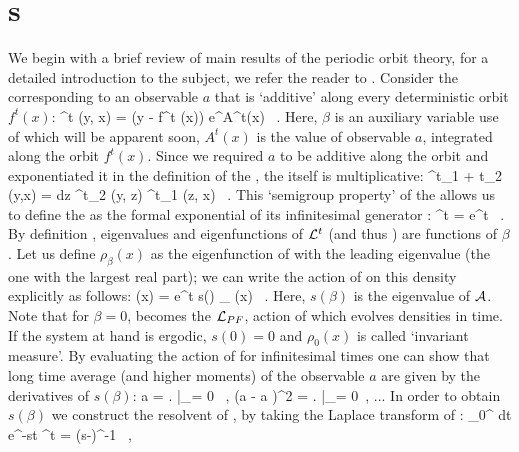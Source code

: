 \section{\CycForm s}
\label{s:DynAvers}

We begin with a brief review of main results of the periodic
orbit theory, for a detailed introduction to the subject, we refer the reader to
. Consider the {\evOper} corresponding to an observable
$a$ that is `additive' along every deterministic orbit $f^t(x)$:
\beq
	\Lop^t (y, x) = \delta (y - f^t (x)) e^{\beta A^t(x)} \, .
	\label{eq-EvOp}
\eeq
Here, $\beta$ is an auxiliary variable use of which will be apparent soon,
$A^t (x)$ is the value of observable $a$, integrated along the orbit $f^t(x)$.
Since we required $a$ to be additive along the orbit and exponentiated
it in the definition of the {\evOper} , the
{\evOper} itself is multiplicative:
\beq
	\Lop^{t_1 + t_2} (y,x) = \int dz \Lop^{t_2} (y, z) \Lop^{t_1} (z, x) \, .
	\label{eq-SemiGroup}
\eeq
This `semigroup property' of the {\evOper} allows us to define
the {\evOper} as the formal exponential of its infinitesimal
generator \Aop :
\beq
	\Lop^t = e^{\Aop t} \, .
	\label{eq-EvOpExp}
\eeq
By definition , eigenvalues and eigenfunctions of ${\cal L}^t$ (and
thus \Aop ) are functions of $\beta$. Let us define $\rho_{\beta} (x)$ as the
eigenfunction of  with the leading eigenvalue (the one with the
largest real part); we can write the action of  on this density
explicitly as follows:
\beq
     (x) = e^{t s(\beta )} \rho_{\beta} (x) \, .
    \label{eq-EigenvalueRel}
\eeq
Here, $s(\beta)$ is the eigenvalue of ${\cal A}$. Note that for $\beta = 0$,
 becomes the {\FPoper} ${\cal L}_{PF}$,
action of which evolves densities in time. If the system at hand is ergodic,
$s(0) = 0$ and $\rho_0 (x)$ is called `invariant measure'. By evaluating the action
of  for infinitesimal times one can show that long time average
(and higher moments) of the observable $a$ are given by the derivatives of $s(\beta)$:
\beq
    \langle a \rangle = \left.  \right|_{\beta = 0} \, , \quad
    \langle (a - \langle a \rangle )^2 \rangle = \left. 
                                                     \right|_{\beta = 0} \,, ...
    \label{eq-moments}
\eeq
In order to obtain $s(\beta)$ we construct the resolvent of \Aop , by taking the
Laplace transform of :
\beq
	\int_0^{\infty} dt e^{-st} \Lop^t = (s-\Aop)^{-1} \, ,
	\label{eq-ResoolventA}
